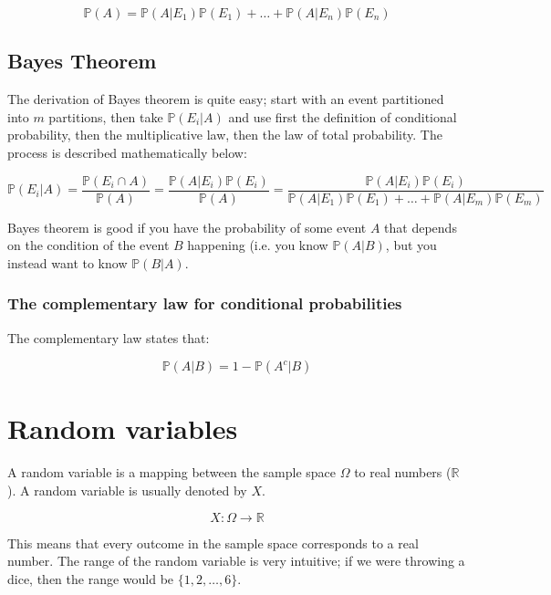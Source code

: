 \begin{dmath}
	\mathbb{P}(A) = \mathbb{P}(A|E_1)\mathbb{P}(E_1) + \dots + \mathbb{P}(A|E_n)\mathbb{P}(E_n)
\end{dmath}

\subsection{Bayes Theorem}

The derivation of Bayes theorem is quite easy; start with an event partitioned
into $m$ partitions, then take $\mathbb{P}(E_i|A)$ and use first the definition
of conditional probability, then the multiplicative law, then the law of total
probability. The process is described mathematically below:

\begin{dmath}
	\mathbb{P}(E_i|A) = \frac{\mathbb{P}(E_i \cap A)}{\mathbb{P}(A)} = \frac{\mathbb{P}(A|E_i)\mathbb{P}(E_i)}{\mathbb{P}(A)} = \frac{\mathbb{P}(A|E_i)\mathbb{P}(E_i)}{\mathbb{P}(A|E_1)\mathbb{P}(E_1) + \dots + \mathbb{P}(A|E_m)\mathbb{P}(E_m)}
\end{dmath}

Bayes theorem is good if you have the probability of some event $A$ that depends
on the condition of the event $B$ happening (i.e. you know $\mathbb{P}(A|B)$,
but you instead want to know $\mathbb{P}(B|A)$.

\subsubsection{The complementary law for conditional probabilities}

The complementary law states that:

\begin{dmath}
	\mathbb{P}(A|B) = 1 - \mathbb{P}(A^c|B)
\end{dmath}

\section{Random variables}

A random variable is a mapping between the sample space $\Omega$ to real numbers
($\mathbb{R}$). A random variable is usually denoted by $X$.

\begin{dmath}
	X : \Omega \rightarrow \mathbb{R}
\end{dmath}

This means that every outcome in the sample space corresponds to a real number.
The range of the random variable is very intuitive; if we were throwing a dice,
then the range would be $\{1, 2, \dots, 6\}$.

